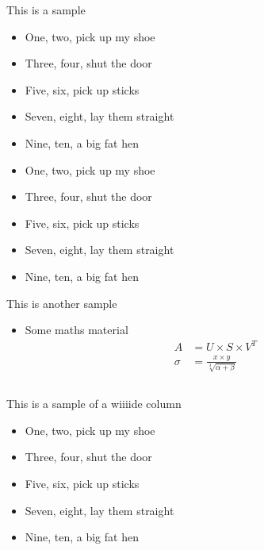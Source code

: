 \documentclass{beamer}
\begin{document}
\begin{frame}[fragile]
\begin{columns}[T]
\begin{column}{.46\textwidth}
\begin{block}{This is a sample}
\begin{itemize}
\item One, two, pick up my shoe
\item Three, four, shut the door
\item Five, six, pick up sticks
\item Seven, eight, lay them straight
\item Nine, ten, a big fat hen
\item One, two, pick up my shoe
\item Three, four, shut the door
\item Five, six, pick up sticks
\item Seven, eight, lay them straight
\item Nine, ten, a big fat hen
\end{itemize}
\end{block}


\begin{block}{This is another sample}
\begin{itemize}
\item Some maths material
\begin{align}
A &= U \times S \times V^T\\
\sigma &= \frac{x\times y}{\sqrt[3]{\alpha + \beta}}
\end{align}
\end{itemize}
\end{block}
\end{column}
\end{columns}

\begin{block}{This is a sample of a wiiiide column}
\begin{itemize}
\item One, two, pick up my shoe
\item Three, four, shut the door
\item Five, six, pick up sticks
\item Seven, eight, lay them straight
\item Nine, ten, a big fat hen
\end{itemize}
\end{block}



\end{frame}
\end{document}
